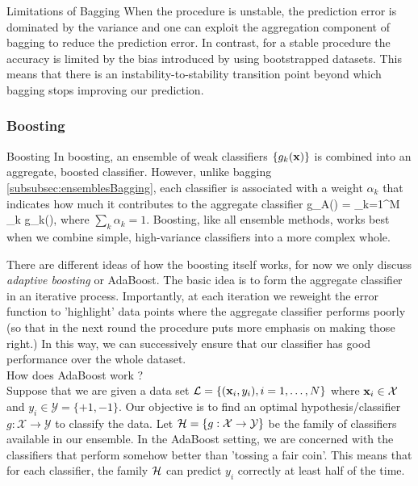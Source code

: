 \begin{mybox}{Limitations of Bagging}
When the procedure is unstable, the prediction error is dominated by the variance and one can exploit the aggregation component of bagging to reduce the prediction error. In contrast, for a stable procedure the accuracy is limited by the bias introduced by using bootstrapped datasets. This means that there is an instability-to-stability transition point beyond which bagging stops improving our prediction.
\end{mybox}
\subsubsection{Boosting}
\label{subsubsec:ensemblesBoosting}
 \begin{mybox}{Boosting}
 	In boosting, an ensemble of weak classifiers $\{g_k(\mathbf{x})\}$ is combined into an aggregate, boosted classifier. However, unlike bagging \ref{subsubsec:ensemblesBagging}, each classifier is associated with a weight $\alpha_k$ that indicates how much it contributes to the aggregate classifier
 	\be 
 	\label{eq:ensemblesBoostingAggregateClassifier}
 	g_A(\mx) = \sum_{k=1}^M \alpha_k g_k(\mx),
 	\ee 
 	where $\sum_k \alpha_k =1$. Boosting, like all ensemble methods, works best when we combine simple, high-variance classifiers into a more complex whole.
 \end{mybox}
There are different ideas of how the boosting itself works, for now we only discuss \emph{adaptive boosting} or AdaBoost. The basic idea is to form the aggregate classifier in an iterative process. Importantly, at each iteration we reweight the error function to ’highlight’ data points where the aggregate classifier performs poorly (so that in the next round the procedure puts more emphasis on making those right.) In this way, we can successively ensure that our classifier has good performance over the whole dataset.\\
How does AdaBoost work ?\\
Suppose that we are given a data set $\mathcal{L}=\{(\mathbf{x}_i,y_i),i=1,\dots,N\}$ where $\mathbf{x}_i \in \mathcal{X}$ and $y_i\in\mathcal{Y}=\{+1,-1\}$. Our objective is to find an optimal hypothesis/classifier $g:\mathcal{X}\rightarrow \mathcal{Y}$ to classify the data. Let $\mathcal{H}=\{g:\mathcal{X}\rightarrow \mathcal{Y}\}$ be the family of classifiers available in our ensemble. In the AdaBoost setting, we are concerned with the classifiers that perform somehow better than ’tossing a fair coin’. This means that for each classifier, the family $\mathcal{H}$ can predict $y_i$ correctly at least half of the time.\\

